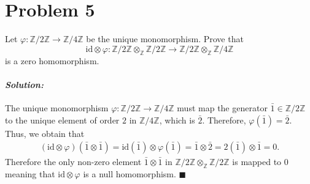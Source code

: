 \documentclass[12pt, a4paper]{article}
\newenvironment{solution}
  {\paragraph{\textit{Solution:}}\par\medskip}
  {\hfill$\blacksquare$\vspace{0.1cm}}
\begin{document}
\section*{Problem 5}
Let $\varphi : \mathbb{Z}/2\mathbb{Z} \to \mathbb{Z}/4\mathbb{Z}$ be the unique monomorphism. Prove that 
\[ \text{id} \otimes \varphi : \mathbb{Z}/2\mathbb{Z} \otimes_{\mathbb{Z}} \mathbb{Z}/2\mathbb{Z} \to \mathbb{Z}/2\mathbb{Z} \otimes_{\mathbb{Z}} \mathbb{Z}/4\mathbb{Z} \]
is a zero homomorphism.
\begin{solution}
    The unique monomorphism $\varphi : \mathbb{Z}/2\mathbb{Z} \to \mathbb{Z}/4\mathbb{Z}$ must map the generator $\bar{1} \in \mathbb{Z}/2\mathbb{Z}$ to the unique element of order $2$ in $\mathbb{Z}/4\mathbb{Z}$, which is $\bar{2}$. Therefore, $\varphi(\bar{1}) = \bar{2}$. 
    Thus, we obtain that 
    \begin{align*}
        (\text{id} \otimes \varphi)(\bar{1} \otimes \bar{1}) = \text{id}(\bar{1}) \otimes \varphi(\bar{1}) = \bar{1} \otimes \bar{2} = 2(\bar{1})\otimes \bar{1} = 0.
    \end{align*}
    Therefore the only non-zero element $\bar{1} \otimes \bar{1}$ in $\mathbb{Z}/2\mathbb{Z} \otimes_{\mathbb{Z}} \mathbb{Z}/2\mathbb{Z}$ is mapped to 0 meaning that $\text{id} \otimes \varphi$ is a null homomorphism.
\end{solution}
\end{document}
